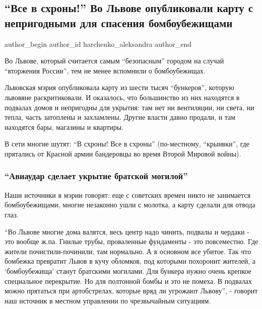  
 
 
 
 
 
\subsection{\enquote{Все в схроны!} Во Львове опубликовали карту с непригодными для спасения бомбоубежищами}
\label{sec:15_02_2022.stz.news.ua.strana.1.vse_v_shrony}
 
\ifcmt
 author_begin
   author_id harchenko_aleksandra
 author_end
\fi

Во Львове, который считается самым \enquote{безопасным} городом на случай \enquote{вторжения
России}, тем не менее вспомнили о бомбоубежищах.

Львовская мэрия опубликовала карту из шести тысяч \enquote{бункеров}, которую львовяне
раскритиковали. И оказалось, что большинство из них находятся в подвалах домов
и непригодны для укрытия: там нет ни вентиляции, ни света, ни тепла, часть
затоплены и захламлены. Другие власти давно продали, и там находятся бары,
магазины и квартиры.

В сети многие шутят: \enquote{В схроны! Все в схроны} (по-местному, \enquote{крыивки}, где
прятались от Красной армии бандеровцы во время Второй Мировой войны). 

\subsubsection{\enquote{Авиаудар сделает укрытие братской могилой}}

Наши источники в мэрии говорят: еще с советских времен никто не занимается
бомбоубежищами, многие незаконно ушли с молотка, а карту сделали для отвода
глаз.


\enquote{Во Львове многие дома валятся, весь центр надо чинить, подвалы и
чердаки - это вообще ж.па. Гнилые трубы, проваленные фундаменты - это
повсеместно. Где жители почистили-починили, там нормально. А в основном все
убитое. Так что бомбежка превратит Львов в кучу обломков, под которыми
похоронит жителей, а \enquote{бомбоубежища} станут братскими могилами. Для
бункера нужно очень крепкое специальное перекрытие. Но для полтонной бомбы и
это не помеха. В подвалах можно прятаться при артобстрелах, которые вряд ли
угрожают Львову}, - говорит наш источник в местном управлении по чрезвычайным
ситуациям.  

